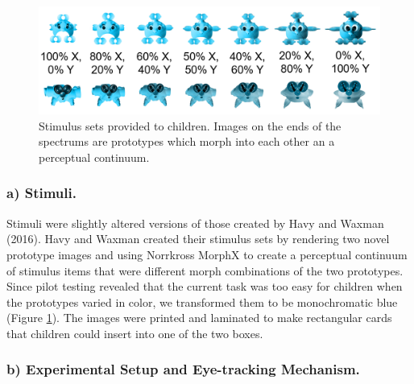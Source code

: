 \documentclass[floatsintext,man]{apa6}
\theoremstyle{definition}
\theoremstyle{definition}
\theoremstyle{definition}
\theoremstyle{remark}
\begin{document}
\begin{figure}

{\centering \includegraphics[width=4.91in]{../images/stimuli} 

}

\caption{Stimulus sets provided to children. Images on the ends of the spectrums are prototypes which morph into each other an a perceptual continuum.}\label{fig:stimuli}
\end{figure}

\subsubsection{a) Stimuli.}\label{a-stimuli.}

Stimuli were slightly altered versions of those created by Havy and
Waxman (2016). Havy and Waxman created their stimulus sets by rendering
two novel prototype images and using Norrkross MorphX to create a
perceptual continuum of stimulus items that were different morph
combinations of the two prototypes. Since pilot testing revealed that
the current task was too easy for children when the prototypes varied in
color, we transformed them to be monochromatic blue (Figure
\ref{fig:stimuli}). The images were printed and laminated to make
rectangular cards that children could insert into one of the two boxes.

\subsubsection{b) Experimental Setup and Eye-tracking
Mechanism.}\label{b-experimental-setup-and-eye-tracking-mechanism.}
\end{document}
